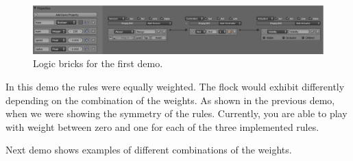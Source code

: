 \begin{figure}[htbp]
\begin{center}
\includegraphics[scale=0.32]{figures/demo1_logic.pdf}
\caption{Logic bricks for the first demo.}
\label{demo1_label}
\end{center}
\end{figure}


In this demo the rules were equally weighted. The flock would exhibit differently depending on the combination of the weights. As shown in the previous demo, when we were showing the symmetry of the rules. Currently, you are able to play with weight between zero and one for each of the three implemented rules.

Next demo shows examples of different combinations of the weights.


